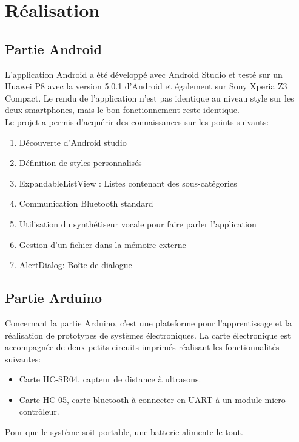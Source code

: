 \section{Réalisation}
\subsection{Partie Android}
L'application Android a été développé avec Android Studio et testé sur un Huawei P8 avec la version 5.0.1 d'Android et également sur Sony Xperia Z3 Compact. Le rendu de l'application n'est pas identique au niveau style sur les deux smartphones, mais le bon fonctionnement reste identique.\\
Le projet a permis d'acquérir des connaissances sur les points suivants:
\begin{enumerate}
	\item Découverte d'Android studio
	\item Définition de styles personnalisés
	\item ExpandableListView : Listes contenant des sous-catégories
	\item Communication Bluetooth standard
	\item Utilisation du synthétiseur vocale pour faire parler l'application
	\item Gestion d'un fichier dans la mémoire externe
	\item AlertDialog: Boîte de dialogue\\
\end{enumerate}

\subsection{Partie Arduino}
Concernant la partie Arduino, c'est une plateforme pour l'apprentissage et la réalisation de prototypes de systèmes électroniques. La carte électronique est accompagnée de deux petits circuits imprimés réalisant les fonctionnalités suivantes:
\begin{itemize}
	\item Carte HC-SR04, capteur de distance à ultrasons.
	\item Carte HC-05, carte bluetooth à connecter en UART à un module micro-contrôleur.
\end{itemize}
Pour que le système soit portable, une batterie alimente le tout.